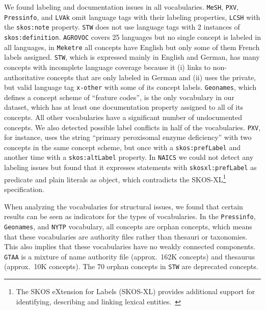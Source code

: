 We found labeling and documentation issues in all vocabularies.
\texttt{MeSH}, \texttt{PXV}, \texttt{Pressinfo}, and \texttt{LVAk} omit language tags with their labeling properties, \texttt{LCSH} with the \texttt{skos:note} property. \texttt{STW} does not use language tags with 2 instances of \texttt{skos:definition}.
\texttt{AGROVOC} covers 25 languages but no single concept is labeled in all languages, in \texttt{Meketre} all concepts have English but only some of them French labels assigned. \texttt{STW}, which is expressed mainly in English and German, has many concepts with incomplete language coverage because it (i) links to non-authoritative concepts that are only labeled in German and (ii) uses the private, but valid language tag \texttt{x-other} with some of its concept labels.
\texttt{Geonames}, which defines a concept scheme of ``feature codes'', is the only vocabulary in our dataset, which has at least one documentation property assigned to all of its concepts. All other vocabularies have a significant number of undocumented concepts.
We also detected possible label conflicts in half of the vocabularies. \texttt{PXV}, for instance, uses the string ``primary peroxisomal enzyme deficiency'' with two concepts in the same concept scheme, but once with a \texttt{skos:prefLabel} and another time with a \texttt{skos:altLabel} property. In \texttt{NAICS} we could not detect any labeling issues but found that it expresses statements with \texttt{skosxl:prefLabel} as predicate and plain literals as object, which contradicts the SKOS-XL\footnote{The SKOS eXtension for Labels (SKOS-XL) provides additional support for identifying, describing and linking lexical entities.~\cite{SkosReference2008}} specification. 

When analyzing the vocabularies for structural issues, we found that certain results can be seen as indicators for the types of vocabularies.
In the \texttt{Pressinfo}, \texttt{Geonames}, and \texttt{NYTP} vocabulary, all concepts are orphan concepts, which means that these vocabularies are authority files rather than thesauri or taxonomies. This also implies that these vocabularies have no weakly connected components. \texttt{GTAA} is a mixture of name authority file (approx.~162K concepts) and thesaurus (approx.~10K concepts). The 70 orphan concepts in \texttt{STW} are deprecated concepts.

